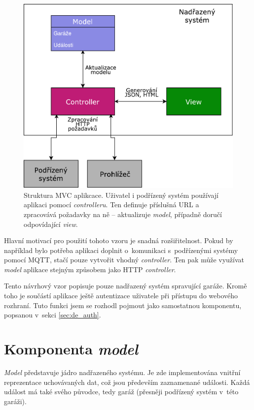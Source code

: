 \begin{figure}[h!]
    \centering
    \includegraphics[width=\textwidth]{images/mvc.pdf}
    \caption[Struktura MVC aplikace]{Struktura MVC aplikcace. Uživatel i podřízený systém používají aplikaci pomocí \textit{controlleru}. Ten definuje příslušná URL a zpracovává požadavky na ně -- aktualizuje \textit{model}, případně doručí odpovídající \textit{view}.}
    \label{fig:mvc}
\end{figure}

Hlavní motivací pro použití tohoto vzoru je snadná rozšiřitelnost. Pokud by například bylo potřeba aplikaci doplnit o~komunikaci s~podřízenými systémy pomocí MQTT, stačí pouze vytvořit vhodný \textit{controller}. Ten pak může využívat \textit{model} aplikace stejným způsobem jako HTTP \textit{controller}.

Tento návrhový vzor popisuje pouze nadřazený systém spravující garáže. Kromě toho je součástí aplikace ještě autentizace uživatele při přístupu do webového rozhraní. Tuto funkci jsem se rozhodl pojmout jako samostatnou komponentu, popsanou v~sekci \ref{sec:de_auth}.

\section{Komponenta \textit{model}}
\label{sec:de_model}

\textit{Model} představuje jádro nadřazeného systému. Je zde implementována vnitřní reprezentace uchovávaných dat, což jsou především zaznamenané události. Každá událost má také svého původce, tedy garáž (přesněji podřízený systém v~této garáži).

